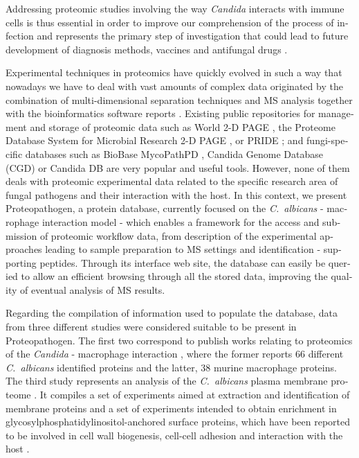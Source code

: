 \begin{otherlanguage}{british}
Addressing proteomic studies involving the way \textit{Candida}
interacts with immune cells is thus essential in order to
improve our comprehension of the process of infection and
represents the primary step of investigation that could lead
to future development of diagnosis methods, vaccines and
antifungal drugs \citep{Fernandez-Arenas2007, Martinez-Solano2006a, Pitarch2006, Pitarch2006a}.


Experimental techniques in proteomics have quickly
evolved in such a way that nowadays we have to deal with
vast amounts of complex data originated by the combination
of multi-dimensional separation techniques and MS analysis
 together with the bioinformatics software reports \citep{Monteoliva2004}.
Existing public repositories for management and storage of
proteomic data such as World 2-D PAGE \citep{Hoogland2008}, the Proteome
Database System for Microbial Research 2-D PAGE \citep{Pleissner2004}, or
PRIDE \citep{Martens2005}; and fungi-specific databases such as BioBase
MycoPathPD \citep{Csank2002}, Candida Genome Database (CGD) \citep{Arnaud2005}
or Candida DB \citep{Rossignol2008} are very popular and useful tools.
However, none of them deals with proteomic experimental
data related to the specific research area of fungal pathogens
and their interaction with the host. In this context,
we present Proteopathogen, a protein database, currently
focused on the \textit{\mbox{C. albicans}} - macrophage interaction
model - which enables a framework for the access and
submission of proteomic workflow data, from description of
the experimental approaches leading to sample preparation
to MS settings and identification - supporting peptides.
Through its interface web site, the database can easily be
queried to allow an efficient browsing through all the stored
data, improving the quality of eventual analysis of MS
results.

Regarding the compilation of information used to
populate the database, data from three different studies were
considered suitable to be present in Proteopathogen.
The first two correspond to publish works relating to
proteomics of the \textit{Candida} - macrophage interaction
\citep{Fernandez-Arenas2007, Martinez-Solano2006a}, where the former reports 
66 different \textit{\mbox{C. albicans}}
identified proteins and the latter, 38 murine macrophage
proteins. The third study represents an analysis of the
\textit{\mbox{C. albicans}} plasma membrane proteome \citep{Cabezon2009}. It compiles
a set of experiments aimed at extraction and identification of
membrane proteins and a set of experiments intended to
obtain enrichment in glycosylphosphatidylinositol-anchored
surface proteins, which have been reported to be involved in
cell wall biogenesis, cell-cell adhesion and interaction with
the host \citep{Plaine2008}.





\end{otherlanguage}
